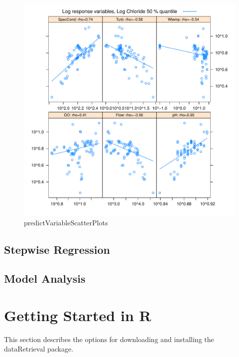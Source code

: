 \documentclass[a4paper,11pt]{article}\usepackage[]{graphicx}\usepackage[]{color}
\makeatletter
\def\maxwidth{ %
  \ifdim\Gin@nat@width>\linewidth
    \linewidth
  \else
    \Gin@nat@width
  \fi
}
\newenvironment{knitrout}{}{} %
\makeatother
\begin{document}
\begin{knitrout}
\begin{figure}[]
\includegraphics[width=\maxwidth]{figure/predictVariableScatterPlots2} \caption[predictVariableScatterPlots]{predictVariableScatterPlots\label{fig:predictVariableScatterPlots2}}
\end{figure}


\end{knitrout}


\FloatBarrier
\subsection{Stepwise Regression}

\subsection{Model Analysis}

\clearpage
\appendix

\section{Getting Started in R}
\label{sec:appendix1}
This section describes the options for downloading and installing the dataRetrieval package.
\end{document}
